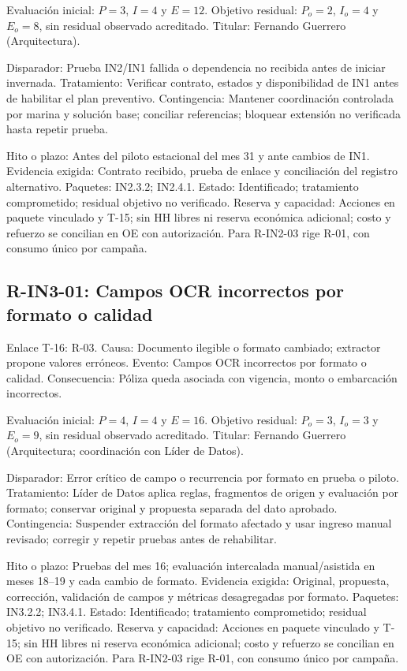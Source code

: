 Evaluación inicial: $P=3$, $I=4$ y $E=12$. Objetivo residual: $P_o=2$, $I_o=4$ y $E_o=8$, sin residual observado acreditado. Titular: Fernando Guerrero (Arquitectura).

Disparador: Prueba IN2/IN1 fallida o dependencia no recibida antes de iniciar invernada. Tratamiento: Verificar contrato, estados y disponibilidad de IN1 antes de habilitar el plan preventivo. Contingencia: Mantener coordinación controlada por marina y solución base; conciliar referencias; bloquear extensión no verificada hasta repetir prueba.

Hito o plazo: Antes del piloto estacional del mes 31 y ante cambios de IN1. Evidencia exigida: Contrato recibido, prueba de enlace y conciliación del registro alternativo. Paquetes: IN2.3.2; IN2.4.1. Estado: Identificado; tratamiento comprometido; residual objetivo no verificado. Reserva y capacidad: Acciones en paquete vinculado y T-15; sin HH libres ni reserva económica adicional; costo y refuerzo se concilian en OE con autorización. Para R-IN2-03 rige R-01, con consumo único por campaña.

\subsection{R-IN3-01: Campos OCR incorrectos por formato o calidad}
Enlace T-16: R-03. Causa: Documento ilegible o formato cambiado; extractor propone valores erróneos. Evento: Campos OCR incorrectos por formato o calidad. Consecuencia: Póliza queda asociada con vigencia, monto o embarcación incorrectos.

Evaluación inicial: $P=4$, $I=4$ y $E=16$. Objetivo residual: $P_o=3$, $I_o=3$ y $E_o=9$, sin residual observado acreditado. Titular: Fernando Guerrero (Arquitectura; coordinación con Líder de Datos).

Disparador: Error crítico de campo o recurrencia por formato en prueba o piloto. Tratamiento: Líder de Datos aplica reglas, fragmentos de origen y evaluación por formato; conservar original y propuesta separada del dato aprobado. Contingencia: Suspender extracción del formato afectado y usar ingreso manual revisado; corregir y repetir pruebas antes de rehabilitar.

Hito o plazo: Pruebas del mes 16; evaluación intercalada manual/asistida en meses 18--19 y cada cambio de formato. Evidencia exigida: Original, propuesta, corrección, validación de campos y métricas desagregadas por formato. Paquetes: IN3.2.2; IN3.4.1. Estado: Identificado; tratamiento comprometido; residual objetivo no verificado. Reserva y capacidad: Acciones en paquete vinculado y T-15; sin HH libres ni reserva económica adicional; costo y refuerzo se concilian en OE con autorización. Para R-IN2-03 rige R-01, con consumo único por campaña.

